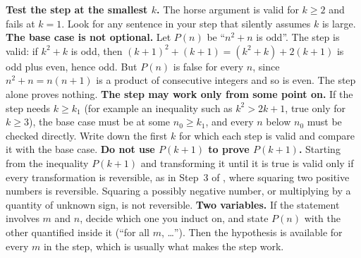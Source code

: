 \documentclass[10pt]{scrartcl}
\newcommand{\PacketInkPath}[2][]{\InkStroke[#1]{#2}}
\begin{document}
\begin{fig}
\end{fig}

\begin{trapbox}
  \ii \textbf{Test the step at the smallest $k$.} The horse argument is valid for $k \geq 2$ and fails at $k = 1$. Look for any sentence in your step that silently assumes $k$ is large.
  \ii \textbf{The base case is not optional.} Let $P(n)$ be ``$n^2 + n$ is odd''. The step is valid: if $k^2 + k$ is odd, then $(k+1)^2 + (k+1) = (k^2 + k) + 2(k+1)$ is odd plus even, hence odd. But $P(n)$ is false for every $n$, since $n^2 + n = n(n+1)$ is a product of consecutive integers and so is even. The step alone proves nothing.
  \ii \textbf{The step may work only from some point on.} If the step needs $k \ge k_1$ (for example an inequality such as $k^2 > 2k + 1$, true only for $k \geq 3$), the base case must be at some $n_0 \ge k_1$, and every $n$ below $n_0$ must be checked directly. Write down the first $k$ for which each step is valid and compare it with the base case.
  \ii \textbf{Do not use $P(k+1)$ to prove $P(k+1)$.} Starting from the inequality $P(k+1)$ and transforming it until it is true is valid only if every transformation is reversible, as in Step~3 of , where squaring two positive numbers is reversible. Squaring a possibly negative number, or multiplying by a quantity of unknown sign, is not reversible.
  \ii \textbf{Two variables.} If the statement involves $m$ and $n$, decide which one you induct on, and state $P(n)$ with the other quantified inside it (``for all $m$, \ldots''). Then the hypothesis is available for every $m$ in the step, which is usually what makes the step work.
\end{trapbox}
\end{document}
